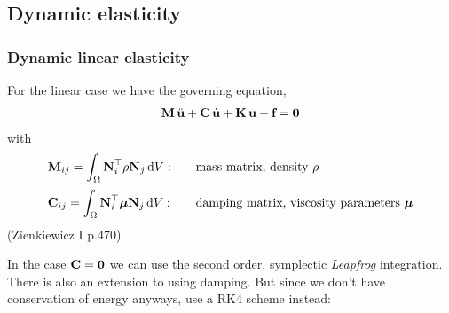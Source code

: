  
\subsection{Dynamic elasticity}

\subsubsection{Dynamic linear elasticity}

For the linear case we have the governing equation,
\begin{equation*}
  \begin{array}{lll}
    \textbf{M}\,\ddot{\textbf{u}} + \textbf{C}\,\dot{\textbf{u}} + \textbf{K}\,\textbf{u} - \textbf{f} = \textbf{0}
  \end{array}
\end{equation*}
with
\begin{equation*}
  \begin{array}{lll}
    \bfM_{ij} = \ds\int_{\Omega} \bfN_i^\top \rho \bfN_j \,\d V: \quad &\text{mass matrix, density $\rho$}\\[4mm]
    \bfC_{ij} = \ds\int_{\Omega} \bfN_i^\top \bfmu \bfN_j \,\d V: &\text{damping matrix, viscosity parameters $\bfmu$}
  \end{array}
\end{equation*}
(Zienkiewicz I p.470)

In the case $\textbf{C} = \textbf{0}$ we can use the second order, symplectic \emph{Leapfrog} integration. There is also an extension to using damping. But since we don't have conservation of energy anyways, use a RK4 scheme instead:

